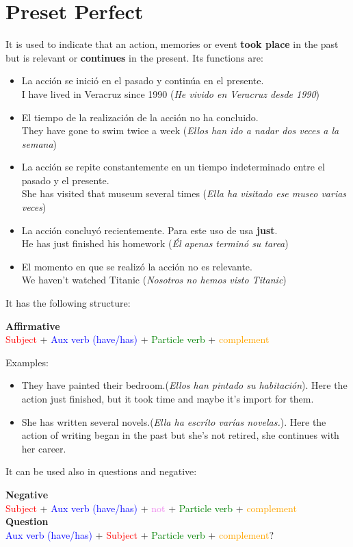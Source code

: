 \documentclass[
	12pt, %
	fleqn, %
	a4paper, %
	oneside, %
]{LegrandOrangeBook}
\begin{document}
\section{Preset Perfect}
It is used to indicate that an action, memories or event \textbf{took place} in the past but is relevant or \textbf{continues} in the present. Its functions are:
\begin{itemize}
\item La acción se inició en el pasado y continúa en el presente.\\
I have lived in Veracruz since 1990 (\textit{He vivido en Veracruz desde 1990})
\item El tiempo de la realización de la acción no ha concluido.\\
They have gone to swim twice a week (\textit{Ellos han ido a nadar dos veces a la semana})
\item La acción se repite constantemente en un tiempo indeterminado entre el pasado y el presente.\\
She has visited that museum several times (\textit{Ella ha visitado ese museo varias veces})
\item La acción concluyó recientemente. Para este uso de usa \textbf{just}.\\
He has just finished his homework (\textit{Él apenas terminó su tarea})
\item El momento en que se realizó la acción no es relevante.\\
We haven’t watched Titanic (\textit{Nosotros no hemos visto Titanic})
\end{itemize}
It has the following structure:
\begin{center}
{\large\textbf{Affirmative}\\\textcolor{red}{Subject} + \textcolor{blue}{Aux verb (have/has)} + \textcolor{green}{Particle verb} + \textcolor{orange}{complement}}
\end{center}
Examples:
\begin{itemize}
\item They have painted their bedroom.(\textit{Ellos han pintado su habitación}). Here the action just finished, but it took time and maybe it's import for them.
\item She has written several novels.(\textit{Ella ha escríto varías novelas.}). Here the action of writing began in the past but she's not retired, she continues with her career.
\end{itemize}
It can be used also in questions and negative:
\begin{center}
{\large\textbf{Negative}\\\textcolor{red}{Subject} + \textcolor{blue}{Aux verb (have/has)} + \textcolor{violet}{not} + \textcolor{green}{Particle verb} + \textcolor{orange}{complement}\\
\textbf{Question}\\\textcolor{blue}{Aux verb (have/has)} + \textcolor{red}{Subject} + \textcolor{green}{Particle verb} + \textcolor{orange}{complement}?}
\end{center}
\end{document}
